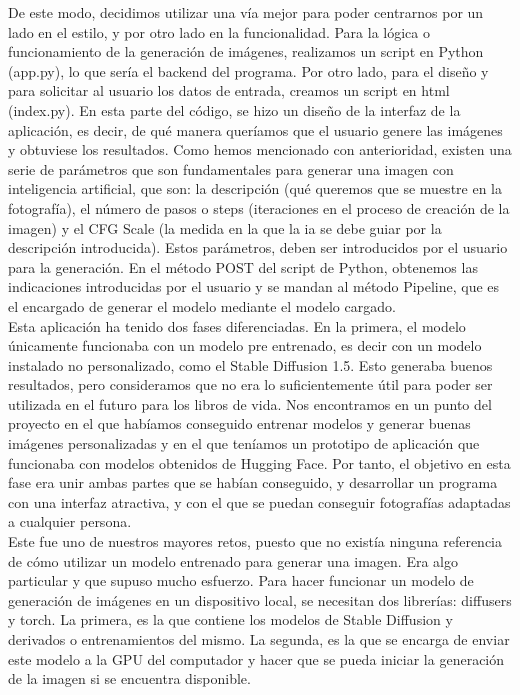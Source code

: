 De este modo, decidimos utilizar una vía mejor para poder centrarnos por un lado en el estilo, y por otro lado en la funcionalidad. Para la lógica o funcionamiento de la generación de imágenes, realizamos un script en Python (app.py), lo que sería el backend del programa. Por otro lado, para el diseño y para solicitar al usuario los datos de entrada, creamos un script en html (index.py). En esta parte del código, se hizo un diseño de la interfaz de la aplicación, es decir, de qué manera queríamos que el usuario genere las imágenes y obtuviese los resultados. Como hemos mencionado con anterioridad, existen una serie de parámetros que son fundamentales para generar una imagen con inteligencia artificial, que son: la descripción (qué queremos que se muestre en la fotografía), el número de pasos o steps (iteraciones en el proceso de creación de la imagen) y el CFG Scale (la medida en la que la ia se debe guiar por la descripción introducida). Estos parámetros, deben ser introducidos por el usuario para la generación. En el método POST del script de Python, obtenemos las indicaciones introducidas por el usuario y se mandan al método Pipeline, que es el encargado de generar el modelo mediante el modelo cargado.\\

Esta aplicación ha tenido dos fases diferenciadas. En la primera, el modelo únicamente funcionaba con un modelo pre entrenado, es decir con un modelo instalado no personalizado, como el Stable Diffusion 1.5. Esto generaba buenos resultados, pero consideramos que no era lo suficientemente útil para poder ser utilizada en el futuro para los libros de vida. Nos encontramos en un punto del proyecto en el que habíamos conseguido entrenar modelos y generar buenas imágenes personalizadas y en el que teníamos un prototipo de aplicación que funcionaba con modelos obtenidos de Hugging Face. Por tanto, el objetivo en esta fase era unir ambas partes que se habían conseguido, y desarrollar un programa con una interfaz atractiva, y con el que se puedan conseguir fotografías adaptadas a cualquier persona. \\

Este fue uno de nuestros mayores retos, puesto que no existía ninguna referencia de cómo utilizar un modelo entrenado para generar una imagen. Era algo particular y que supuso mucho esfuerzo. Para hacer funcionar un modelo de generación de imágenes en un dispositivo local, se necesitan dos librerías: diffusers y torch. La primera, es la que contiene los modelos de Stable Diffusion y derivados o entrenamientos del mismo. La segunda, es la que se encarga de enviar este modelo a la GPU del computador y hacer que se pueda iniciar la generación de la imagen si se encuentra disponible. \\

